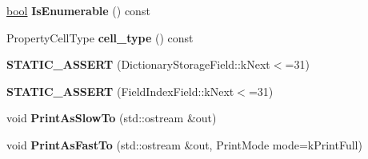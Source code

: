 \begin{DoxyCompactItemize}
\mbox{\hyperlink{classbool}{bool}} {\bfseries Is\+Enumerable} () const
\item 
\mbox{\label{classv8_1_1internal_1_1PropertyDetails_a536f7bd0ad8d23bac25741b8c5255276}} 
Property\+Cell\+Type {\bfseries cell\+\_\+type} () const
\item 
\mbox{\label{classv8_1_1internal_1_1PropertyDetails_a7b615a8d0b1fdf97f6fbda8ca4f3442d}} 
{\bfseries S\+T\+A\+T\+I\+C\+\_\+\+A\+S\+S\+E\+RT} (Dictionary\+Storage\+Field\+::k\+Next$<$=31)
\item 
\mbox{\label{classv8_1_1internal_1_1PropertyDetails_a9ec0d1bfe701004ec09036cfc022e33e}} 
{\bfseries S\+T\+A\+T\+I\+C\+\_\+\+A\+S\+S\+E\+RT} (Field\+Index\+Field\+::k\+Next$<$=31)
\item 
\mbox{\label{classv8_1_1internal_1_1PropertyDetails_aa15a5fc0b91bfc7fae7bef349240e0f6}} 
void {\bfseries Print\+As\+Slow\+To} (std\+::ostream \&out)
\item 
\mbox{\label{classv8_1_1internal_1_1PropertyDetails_a84b1c2bb878391f781e69d9da94ba8b3}} 
void {\bfseries Print\+As\+Fast\+To} (std\+::ostream \&out, Print\+Mode mode=k\+Print\+Full)
\end{DoxyCompactItemize}
